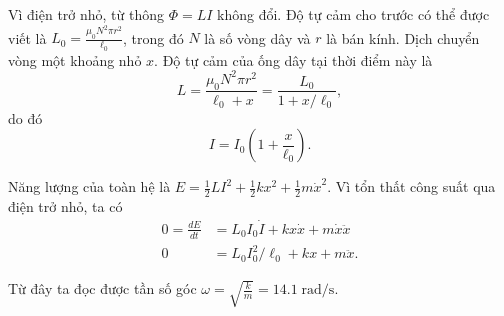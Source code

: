 




\begin{solution}

Vì điện trở nhỏ, từ thông $\Phi=LI$ không đổi. Độ tự cảm cho trước có thể được viết là $L_0=\frac{\mu_0 N^2 \pi r^2}{\ell_0}$, trong đó $N$ là số vòng dây và $r$ là bán kính. Dịch chuyển vòng một khoảng nhỏ $x$. Độ tự cảm của ống dây tại thời điểm này là $$L=\frac{\mu_0 N^2\pi r^2}{\ell_0+x}=\frac{L_0}{1+x/\ell_0},$$ do đó $$I=I_0(1+\frac{x}{\ell_0}).$$

Năng lượng của toàn hệ là $E=\frac12 LI^2 + \frac12 kx^2 + \frac12 m\dot{x}^2$. Vì tổn thất công suất qua điện trở nhỏ, ta có
\begin{align*}
    0=\frac{dE}{dt} &= L_0I_0\dot{I} + kx\dot{x} + m\dot{x}\ddot{x} \\
    0 &= L_0I_0^2/\ell_0 + kx + m\ddot{x}.
\end{align*}

Từ đây ta đọc được tần số góc $\omega=\sqrt{\frac{k}{m}}=\boxed{14.1\;\mathrm{rad/s}}.$

\end{solution}
